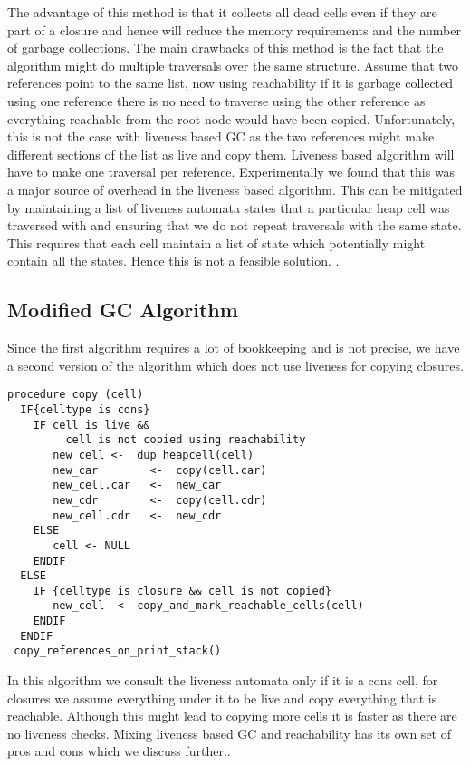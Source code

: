 \documentclass[9pt]{sigplanconf}
\newcommand{\comment}[1]{{\color{Myblue}{(#1)}}}
\newcommand{\cred}[1]{{\color{red}{#1}}}
\begin{document}
The advantage of this method is that it collects all dead cells even if they are part of a closure and hence 
will reduce the memory requirements and the number of garbage collections. The main drawbacks of this method 
is the fact that the algorithm might do multiple traversals over the same structure. Assume that two references 
point to the same list, now using reachability if it is garbage collected using one reference there is no need 
to traverse using the other reference as everything reachable from the root node would have been copied. 
Unfortunately, this is not the case with liveness based GC as the two references might make different sections 
of the list as live and copy them. Liveness based algorithm will have to make one traversal per reference. 
Experimentally we found that this was a major source of overhead in the liveness based algorithm. 
This can be mitigated by maintaining a list of liveness automata states that a particular heap cell was 
traversed with and ensuring that we do not repeat traversals with the same state. This requires that each 
cell maintain a list of state which potentially might contain all the states. Hence this is not a feasible 
solution.
\cred{repeated traversals if sharing}.


\subsection{Modified GC Algorithm}
Since the first algorithm requires a lot of bookkeeping and is not
precise, we have a second version of the algorithm 
which does not use liveness for copying closures. 
\begin{verbatim}
procedure copy (cell)
  IF{celltype is cons}
    IF cell is live &&
         cell is not copied using reachability
       new_cell <-  dup_heapcell(cell) 
       new_car        <-  copy(cell.car)
       new_cell.car   <-  new_car
       new_cdr        <-  copy(cell.cdr)
       new_cell.cdr   <-  new_cdr
    ELSE
       cell <- NULL
    ENDIF
  ELSE
    IF {celltype is closure && cell is not copied}
       new_cell  <- copy_and_mark_reachable_cells(cell)
    ENDIF
  ENDIF
 copy_references_on_print_stack()
\end{verbatim}

In this algorithm we consult the liveness automata only if it is a cons cell, for closures we 
assume everything under it to be live and copy everything that is reachable. Although this might 
lead to copying more cells it is faster as there are no liveness checks. 
\comment{Once experimental results are obtained compare the two algorithms here}
Mixing liveness based GC and reachability has its own set of pros and cons which 
we discuss further.\cred{hanging like a sore thumb}.
\end{document}
